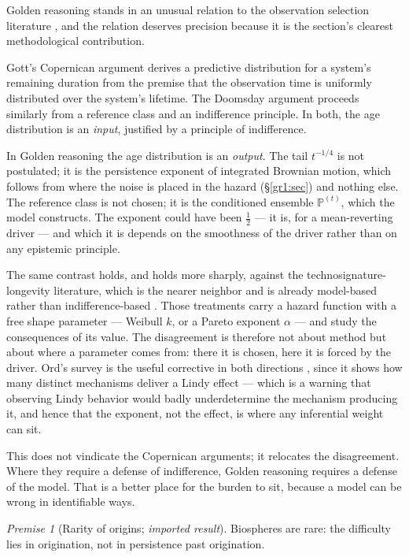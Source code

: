 \documentclass[11pt]{article}
\numberwithin{equation}{section}
\theoremstyle{plain}
\theoremstyle{definition}
\theoremstyle{remark}
\newcommand{\PP}{\mathbb{P}}
\newtheorem{premise}{Premise}
\begin{document}
Golden reasoning stands in an unusual relation to the observation
selection literature \cite{Car83,Got93,Bos02}, and the relation deserves precision because it is the section's clearest methodological
contribution.

Gott's Copernican argument \cite{Got93} derives a predictive
distribution for a system's remaining duration from the premise that the
observation time is uniformly distributed over the system's lifetime.
The Doomsday argument \cite{Car83,Bos02} proceeds similarly from a
reference class and an indifference principle. In both, the age
distribution is an \emph{input}, justified by a principle of
indifference.

In Golden reasoning the age distribution is an \emph{output}. The tail
$t^{-1/4}$ is not postulated; it is the persistence exponent of
integrated Brownian motion, which follows from where the noise is placed
in the hazard (\S\ref{gr1:sec}) and nothing else. The reference class is not
chosen; it is the conditioned ensemble $\PP^{(t)}$, which the model
constructs. The exponent could have been $\tfrac12$ --- it is, for a
mean-reverting driver --- and which it is depends on the smoothness of
the driver rather than on any epistemic principle.

The same contrast holds, and holds more sharply, against the
technosignature-longevity literature, which is the nearer neighbor and
is already model-based rather than indifference-based
\cite{BC21,BG24,Kip20}. Those treatments carry a hazard function with a
free shape parameter --- Weibull $k$, or a Pareto exponent $\alpha$ ---
and study the consequences of its value. The disagreement is therefore
not about method but about where a parameter comes from: there it is
chosen, here it is forced by the driver. Ord's survey is the useful
corrective in both directions \cite{Ord23}, since it shows how many
distinct mechanisms deliver a Lindy effect --- which is a warning that
observing Lindy behavior would badly underdetermine the mechanism
producing it, and hence that the exponent, not the effect, is where any
inferential weight can sit.

This does not vindicate the Copernican arguments; it relocates the
disagreement. Where they require a defense of indifference, Golden
reasoning requires a defense of the model. That is a better place for
the burden to sit, because a model can be wrong in identifiable ways.

\setcounter{premise}{4} %
\begin{premise}[Rarity of origins; \emph{imported result}]
\label{gr:phi5}
Biospheres are rare: the difficulty lies in origination, not in
persistence past origination.
\end{premise}
\end{document}

